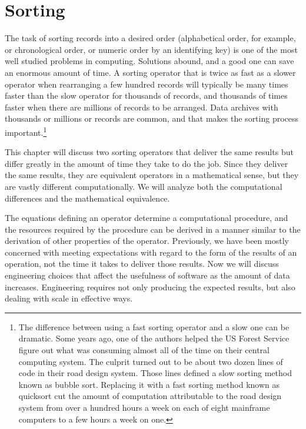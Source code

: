 \chapter{Sorting}
\label{ch:sorting}

The task of sorting records into a desired order
(alphabetical order, for example, or chronological order,
or numeric order by an identifying key)
is one of the most well studied problems in computing.
Solutions abound,
and a good one can save an enormous amount of time.
A sorting operator that is twice as fast
as a slower operator when rearranging a few hundred records
will typically be many times faster than the slow operator
for thousands of records, and thousands of times faster
when there are millions of records to be arranged.
Data archives with thousands or millions or records
are common, and that makes the sorting process important.\footnote{The
difference between using a fast sorting operator and a slow one
can be dramatic.
\label{bubble-vs-quicksort-example}
Some years ago, one of the authors helped the US Forest Service
figure out what was consuming almost all of the time
on their central computing system.
The culprit turned out to be about two dozen lines
of code in their road design system.
Those lines defined a slow sorting method
known as bubble sort. Replacing it with a fast sorting
method known as quicksort cut the amount of computation
attributable to the road design system from over a hundred
hours a week on each of eight mainframe computers to a few hours
a week on one.}

This chapter will discuss two sorting operators that
deliver the same results but differ
greatly in the amount of time they take to do the job.
Since they deliver the same results,
they are equivalent operators in a mathematical sense,
but they are vastly different computationally.
We will analyze both the computational differences
and the 
mathematical equivalence.

The equations defining an operator
determine a computational procedure, and the
resources required by the procedure can be derived
in a manner similar to the derivation of other properties
of the operator.
Previously, we have been mostly concerned with meeting
expectations with regard to the form of the results
of an operation, not the time it takes to deliver those results.
Now we will discuss engineering choices that affect the usefulness of
software as the amount of data increases.
Engineering requires not only producing the expected
results, but also dealing with scale in effective ways.

